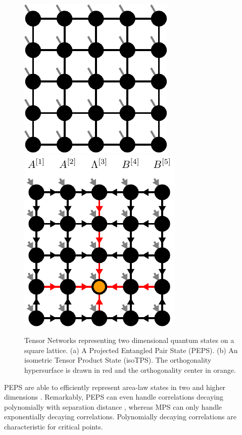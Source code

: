 \begin{figure}
	\centering
	\subcaptionbox{\label{fig:square_PEPS}}
	{%
		\includegraphics[scale=1]{figures/tikz/Tensor_Networks/isoTPS_structure/isoTPS_structure_a.pdf}
	}
	\quad\quad
	\subcaptionbox{\label{fig:square_isoTPS}}
	{%
		\includegraphics[scale=1]{figures/tikz/Tensor_Networks/isoTPS_structure/isoTPS_structure_b.pdf}
	}
	\caption{Tensor Networks representing two dimensional quantum states on a square lattice. (a) A Projected Entangled Pair State (PEPS). (b) An isometric Tensor Product State (isoTPS). The orthogonality hypersurface is drawn in red and the orthogonality center in orange.}
	\label{fig:square_PEPS_and_isoTPS}
\end{figure}
PEPS are able to efficiently represent area-law states in two and higher dimensions \cite{cite:practical_introduction_MPS_and_PEPS}. Remarkably, PEPS can even handle correlations decaying polynomially with separation distance \cite{cite:criticality_the_area_law_and_the_computational_power_of_PEPS}, whereas MPS can only handle exponentially decaying correlations. Polynomially decaying correlations are characteristic for critical points. \par

